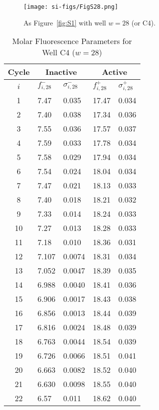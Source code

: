                 \begin{figure}
                    \centering
                    \texttt{[image: si-figs/FigS28.png]}
                    \caption{
                        As Figure~\ref{fig:S1} with well $w=28$ (or C4).
                    }
                \end{figure}
                \clearpage
    \begin{table}
        \caption{Molar Fluorescence Parameters for Well C4 ($w=28$)}
        \centering
        \begin{tabular}{c|ll|ll}
            Cycle & \multicolumn{2}{c|}{Inactive} & \multicolumn{2}{c}{Active} \\
            \hline
            $i$ & $f_{i,28}^{-}$ & $\sigma_{i,28}^{-}$ &  $f_{i,28}^{+}$ & $\sigma_{i,28}^{+}$ \\
            \hline
    1 & 7.47 & 0.035 & 17.47 & 0.034 \\
2 & 7.40 & 0.038 & 17.34 & 0.036 \\
3 & 7.55 & 0.036 & 17.57 & 0.037 \\
4 & 7.59 & 0.033 & 17.78 & 0.034 \\
5 & 7.58 & 0.029 & 17.94 & 0.034 \\
6 & 7.54 & 0.024 & 18.04 & 0.034 \\
7 & 7.47 & 0.021 & 18.13 & 0.033 \\
8 & 7.40 & 0.018 & 18.21 & 0.032 \\
9 & 7.33 & 0.014 & 18.24 & 0.033 \\
10 & 7.27 & 0.013 & 18.28 & 0.033 \\
11 & 7.18 & 0.010 & 18.36 & 0.031 \\
12 & 7.107 & 0.0074 & 18.31 & 0.034 \\
13 & 7.052 & 0.0047 & 18.39 & 0.035 \\
14 & 6.988 & 0.0040 & 18.41 & 0.036 \\
15 & 6.906 & 0.0017 & 18.43 & 0.038 \\
16 & 6.856 & 0.0013 & 18.44 & 0.039 \\
17 & 6.816 & 0.0024 & 18.48 & 0.039 \\
18 & 6.763 & 0.0044 & 18.54 & 0.039 \\
19 & 6.726 & 0.0066 & 18.51 & 0.041 \\
20 & 6.663 & 0.0082 & 18.52 & 0.040 \\
21 & 6.630 & 0.0098 & 18.55 & 0.040 \\
22 & 6.57 & 0.011 & 18.62 & 0.040 \\

\end{tabular}
\end{table}
